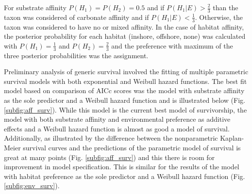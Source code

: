 \documentclass[12pt,letterpaper]{article}
\begin{document}
For substrate affinity \(P(H_{1}) = P(H_{2}) = 0.5\) and if \(P(H_{1}|E) > \frac{2}{3}\) than the taxon was considered of carbonate affinity and if \(P(H_{1}|E) < \frac{1}{3}\). Otherwise, the taxon was considered to have no or mixed affinity. In the case of habitat affinity, the posterior probability for each habitat (inshore, offshore, none) was calculated with \(P(H_{1}) = \frac{1}{3}\) and \(P(H_{2}) = \frac{2}{3}\) and the preference with maximum of the three posterior probabilities was the assignment.

Preliminary analysis of generic survival involved the fitting of multiple parametric survival models with both exponential and Weibull hazard functions. The best fit model based on comparison of AICc scores \citep{Hurvich1989,Akaike1974,Burnham2002a} was the model with substrate affinity as the sole predictor and a Weibull hazard function and is illustrated below (Fig. \ref{subfig:aff_surv}). While this model is the current best model of survivorship, the model with both substrate affinity and environmental preference as additive effects and a Weibull hazard function is almost as good a model of survival. Additionally, as illustrated by the difference between the nonparametric Kaplan-Meier survival curves and the predictions of the parametric model of survival is great at many points (Fig. \ref{subfig:aff_surv}) and this there is room for improvement in model specification. This is similar for the results of the model with habitat preference as the sole predictor and a Weibull hazard function (Fig. \ref{subfig:env_surv}).
\end{document}
